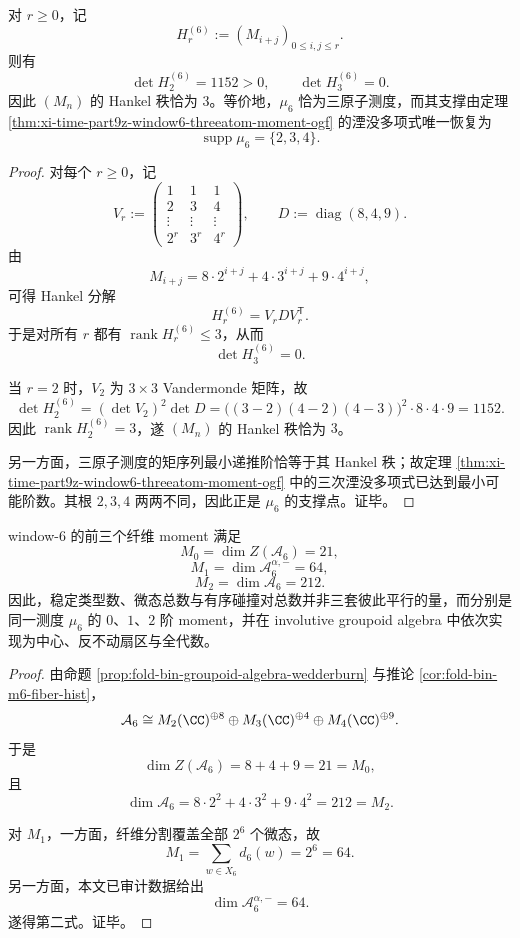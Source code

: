\begin{theorem}\label{thm:xi-time-part9z-window6-threeatom-hankel-flatness}
对 \(r\ge 0\)，记
\[
H_r^{(6)}:=(M_{i+j})_{0\le i,j\le r}.
\]
则有
\[
\det H_2^{(6)}=1152>0,
\qquad
\det H_3^{(6)}=0.
\]
因此 \((M_n)\) 的 Hankel 秩恰为 \(3\)。等价地，\(\mu_6\) 恰为三原子测度，而其支撑由定理 \ref{thm:xi-time-part9z-window6-threeatom-moment-ogf} 的湮没多项式唯一恢复为
\[
\operatorname{supp}\mu_6=\{2,3,4\}.
\]
\end{theorem}
\begin{proof}
对每个 \(r\ge 0\)，记
\[
V_r:=
\begin{pmatrix}
1&1&1\\
2&3&4\\
\vdots&\vdots&\vdots\\
2^r&3^r&4^r
\end{pmatrix},
\qquad
D:=\operatorname{diag}(8,4,9).
\]
由
\[
M_{i+j}=8\cdot 2^{i+j}+4\cdot 3^{i+j}+9\cdot 4^{i+j},
\]
可得 Hankel 分解
\[
H_r^{(6)}=V_r D V_r^{\mathsf T}.
\]
于是对所有 \(r\) 都有 \(\operatorname{rank}H_r^{(6)}\le 3\)，从而
\[
\det H_3^{(6)}=0.
\]

当 \(r=2\) 时，\(V_2\) 为 \(3\times 3\) Vandermonde 矩阵，故
\[
\det H_2^{(6)}
=
(\det V_2)^2\det D
=
\bigl((3-2)(4-2)(4-3)\bigr)^2\cdot 8\cdot 4\cdot 9
=
1152.
\]
因此 \(\operatorname{rank}H_2^{(6)}=3\)，遂 \((M_n)\) 的 Hankel 秩恰为 \(3\)。

另一方面，三原子测度的矩序列最小递推阶恰等于其 Hankel 秩；故定理 \ref{thm:xi-time-part9z-window6-threeatom-moment-ogf} 中的三次湮没多项式已达到最小可能阶数。其根 \(2,3,4\) 两两不同，因此正是 \(\mu_6\) 的支撑点。证毕。
\end{proof}

\begin{theorem}\label{thm:xi-time-part9z-window6-moment-involutive-algebra-realization}
window-\(6\) 的前三个纤维 moment 满足
\[
M_0=\dim Z(\mathcal A_6)=21,
\]
\[
M_1=\dim \mathcal A_6^{\alpha,-}=64,
\]
\[
M_2=\dim \mathcal A_6=212.
\]
因此，稳定类型数、微态总数与有序碰撞对总数并非三套彼此平行的量，而分别是同一测度 \(\mu_6\) 的 \(0\)、\(1\)、\(2\) 阶 moment，并在 involutive groupoid algebra 中依次实现为中心、反不动扇区与全代数。
\end{theorem}
\begin{proof}
由命题 \ref{prop:fold-bin-groupoid-algebra-wedderburn} 与推论 \ref{cor:fold-bin-m6-fiber-hist}，
\[
\mathcal A_6
\cong
M_2(\CC)^{\oplus 8}\oplus M_3(\CC)^{\oplus 4}\oplus M_4(\CC)^{\oplus 9}.
\]
于是
\[
\dim Z(\mathcal A_6)=8+4+9=21=M_0,
\]
且
\[
\dim \mathcal A_6
=
8\cdot 2^2+4\cdot 3^2+9\cdot 4^2
=
212
=
M_2.
\]

对 \(M_1\)，一方面，纤维分割覆盖全部 \(2^6\) 个微态，故
\[
M_1=\sum_{w\in X_6}d_6(w)=2^6=64.
\]
另一方面，本文已审计数据给出
\[
\dim \mathcal A_6^{\alpha,-}=64.
\]
遂得第二式。证毕。
\end{proof}

